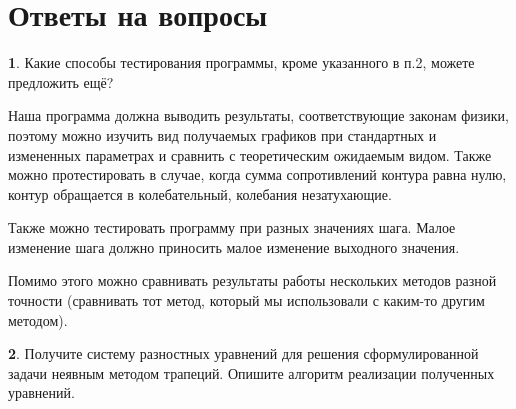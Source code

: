 \documentclass[a4paper,oneside,12pt]{extreport}
\begin{document}
\begin{figure}[ht!]
\end{figure}

\begin{figure}[ht!]
\end{figure}

\newpage
\section{Ответы на вопросы}

\textbf{1}. Какие способы тестирования программы, кроме указанного в п.2, можете предложить
ещё?

Наша программа должна выводить результаты, соответствующие законам физики, 
поэтому можно изучить вид получаемых графиков при стандартных и 
измененных параметрах и сравнить с теоретическим ожидаемым видом.
Также можно протестировать в случае, когда сумма сопротивлений контура равна нулю, 
контур обращается в колебательный, колебания незатухающие.

Также можно тестировать программу при разных значениях шага. 
Малое изменение шага должно приносить малое изменение выходного значения. 

Помимо этого можно сравнивать результаты работы нескольких методов разной точности 
(сравнивать тот метод, который мы использовали с каким-то другим методом).  

\textbf{2}. Получите систему разностных уравнений для решения
сформулированной задачи неявным методом трапеций.
Опишите алгоритм реализации полученных уравнений.
\end{document}
